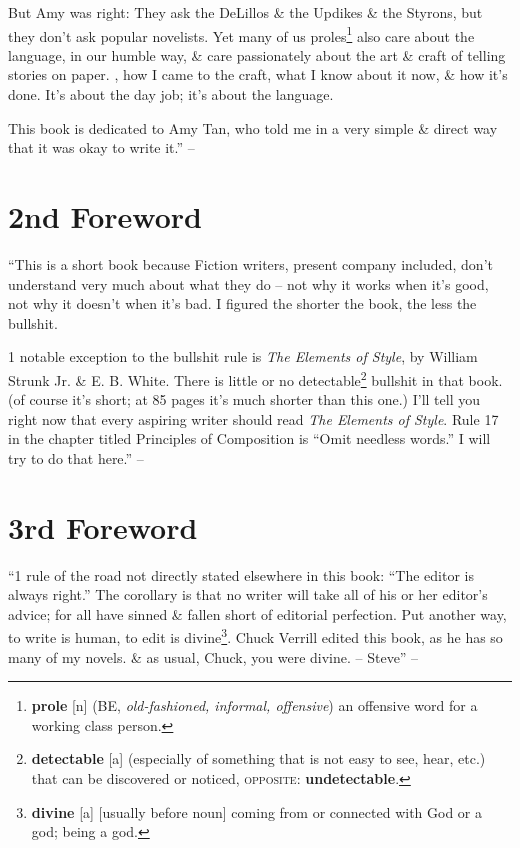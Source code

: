 \documentclass[oneside]{book}
\numberwithin{equation}{section}
\begin{document}
But Amy was right:  They ask the DeLillos \& the Updikes \& the Styrons, but they don't ask popular novelists. Yet many of us proles\footnote{\textbf{prole} [n] (BE, \textit{old-fashioned, informal, offensive}) an offensive word for a working class person.} also care about the language, in our humble way, \& care passionately about the art \& craft of telling stories on paper. , how I came to the craft, what I know about it now, \& how it's done. It's about the day job; it's about the language.

This book is dedicated to Amy Tan, who told me in a very simple \& direct way that it was okay to write it.'' -- \cite[pp. 9--10]{King2010}


\section*{2nd Foreword}
``This is a short book because  Fiction writers, present company included, don't understand very much about what they do -- not why it works when it's good, not why it doesn't when it's bad. I figured the shorter the book, the less the bullshit.

1 notable exception to the bullshit rule is \textit{The Elements of Style}, by William Strunk Jr. \& E. B. White. There is little or no detectable\footnote{\textbf{detectable} [a] (especially of something that is not easy to see, hear, etc.) that can be discovered or noticed, \textsc{opposite}: \textbf{undetectable}.} bullshit in that book. (of course it's short; at 85 pages it's much shorter than this one.) I'll tell you right now that every aspiring writer should read \textit{The Elements of Style}. Rule 17 in the chapter titled Principles of Composition is ``Omit needless words.'' I will try to do that here.'' -- \cite[p. 10]{King2010}


\section*{3rd Foreword}
``1 rule of the road not directly stated elsewhere in this book: ``The editor is always right.'' The corollary is that no writer will take all of his or her editor's advice; for all have sinned \& fallen short of editorial perfection. Put another way, to write is human, to edit is divine\footnote{\textbf{divine} [a] [usually before noun] coming from or connected with God or a god; being a god.}. Chuck Verrill edited this book, as he has so many of my novels. \& as usual, Chuck, you were divine. -- Steve'' -- \cite[p. 11]{King2010}
\end{document}

